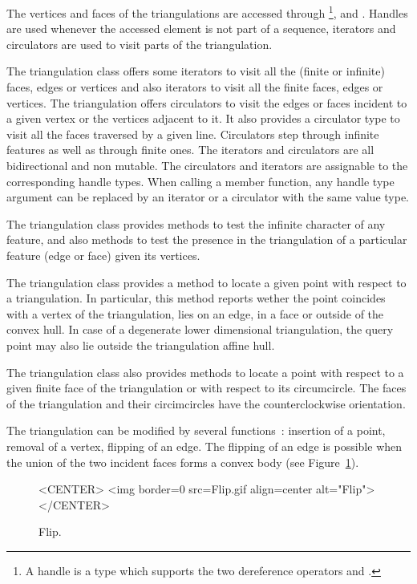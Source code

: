The vertices and faces of the triangulations are accessed through 
\footnote{ A handle is a type which supports the two
dereference operators  and .}, 
 and . 
Handles are used whenever the accessed element 
is not part of a sequence,
iterators and circulators are used
to visit parts of the triangulation.

The triangulation class offers 
some iterators to visit all the (finite or infinite)
faces, edges or vertices and also iterators to visit all the finite
faces, edges  or vertices.
The triangulation offers circulators  
 to visit the edges or faces 
incident to a given vertex or the  vertices 
adjacent to it. It also provides a circulator type
to visit all the faces
traversed by a given line.
Circulators step through infinite features as well as 
through finite ones. 
The iterators and circulators
are all bidirectional and non mutable.
The circulators and iterators are assignable to the 
corresponding handle types. 
When calling a member function,
any handle type argument can be replaced
by an iterator or a circulator
with the same value type.

The triangulation class provides methods to test
the infinite character of any feature,
and also methods to test the presence in the triangulation
of a particular feature (edge or face) given its vertices.

The triangulation class  provides a method to locate
a given point with respect to a triangulation.
In particular, this method reports wether the point
coincides with a vertex of the triangulation, lies on an edge,
in a face or outside of the convex hull. In case of a degenerate 
lower dimensional triangulation, the query point may also lie
outside the triangulation affine hull.

The triangulation class also provides
methods to locate a point with respect to
a given  finite face of the triangulation or with respect to its
circumcircle.
The faces of the triangulation and their circimcircles 
have the  counterclockwise orientation.

The triangulation can be modified by several functions~:
insertion of a point, removal of a vertex,
flipping  of an edge. The flipping of an edge
is possible when the union of the two incident faces
forms  a convex body (see Figure~\ref{I1_fig_flip_bis}). 

\begin{figure}
\begin{ccTexOnly}
\begin{center} %

\end{center}
\end{ccTexOnly} 
\caption{Flip. \label{I1_fig_flip_bis}}

\begin{ccHtmlOnly}
<CENTER>
<img border=0 src=Flip.gif align=center alt="Flip">
</CENTER>
\end{ccHtmlOnly} 
\end{figure}


